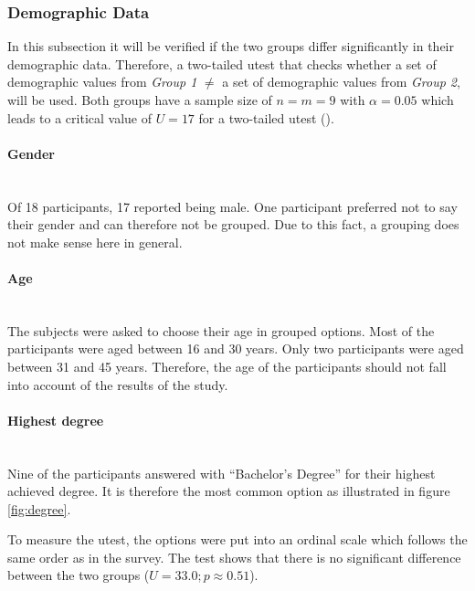 \label{results}
\subsubsection{Demographic Data}
\label{sec:demo}
In this subsection it will be verified if the two groups differ significantly in their demographic data. 
Therefore, a two-tailed \gls{utest} that checks whether a set of demographic values from \textit{Group 1} $\neq$  a set of demographic values from \textit{Group 2}, will be used.
Both groups have a sample size of $n = m = 9 $ with $\alpha = 0.05$ which leads to a critical value of $U = 17$ for a two-tailed \gls{utest} (\cite{zar2010biostatistical}).

\paragraph{Gender}\mbox{}\\
Of 18 participants, 17 reported being male. 
One participant preferred not to say their gender and can therefore not be grouped.
Due to this fact, a grouping does not make sense here in general. 

\paragraph{Age}\mbox{}\\
The subjects were asked to choose their age in grouped options. 
Most of the participants were aged between 16 and 30 years.
Only two participants were aged between 31 and 45 years. 
Therefore, the age of the participants should not fall into account of the results of the study.

\paragraph{Highest degree}\mbox{}\\
Nine of the participants answered with \enquote{Bachelor's Degree} for their highest achieved degree. 
It is therefore the most common option as illustrated in figure \ref{fig:degree}.

To measure the \gls{utest}, the options were put into an ordinal scale which follows the same order as in the survey.
The test shows that there is no significant difference between the two groups ($U = 33.0; p \approx 0.51$).

